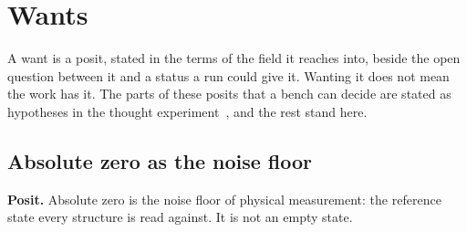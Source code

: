 \chapter{Wants}

A want is a posit, stated in the terms of the field it reaches into, beside the open question between
it and a status a run could give it. Wanting it does not mean the work has it. The parts of these
posits that a bench can decide are stated as hypotheses in the thought
experiment~\cite{src:Quigg-thought-experiments-orior}, and the rest stand here.

\section{Absolute zero as the noise floor}

\textbf{Posit.} Absolute zero is the noise floor of physical measurement: the reference state every
structure is read against. It is not an empty state.

